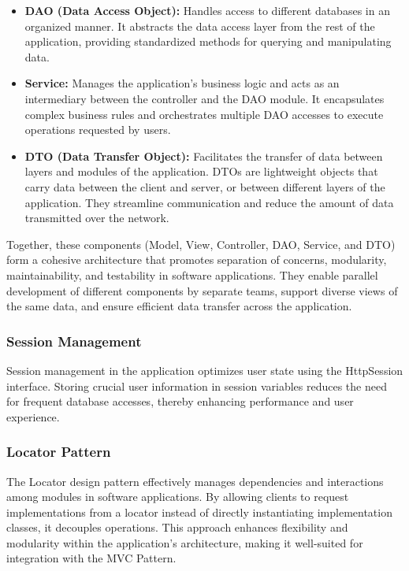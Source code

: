 \begin{itemize}
\item \textbf{DAO (Data Access Object):} Handles access to different databases in an organized manner. It abstracts the data
access layer from the rest of the application, providing standardized methods for querying and manipulating data.

\item \textbf{Service:} Manages the application's business logic and acts as an intermediary between the controller and the 
DAO module. It encapsulates complex business rules and orchestrates multiple DAO accesses to execute operations requested by users.

\item \textbf{DTO (Data Transfer Object):} Facilitates the transfer of data between layers and modules of the application. 
DTOs are lightweight objects that carry data between the client and server, or between different layers of the application. 
They streamline communication and reduce the amount of data transmitted over the network.
\end{itemize}

\vspace{\baselineskip}

Together, these components (Model, View, Controller, DAO, Service, and DTO) form a cohesive architecture that promotes 
separation of concerns, modularity, maintainability, and testability in software applications. They enable parallel 
development of different components by separate teams, support diverse views of the same data, and ensure efficient data 
transfer across the application.

\subsubsection*{Session Management}

Session management in the application optimizes user state using the HttpSession interface. Storing crucial user information in session variables 
reduces the need for frequent database accesses, thereby enhancing performance and user experience.

\subsubsection*{Locator Pattern}

The Locator design pattern effectively manages dependencies and interactions among modules in software applications.
By allowing clients to request implementations from a locator instead of directly instantiating implementation 
classes, it decouples operations. This approach enhances flexibility and modularity within the application's 
architecture, making it well-suited for integration with the MVC Pattern.

